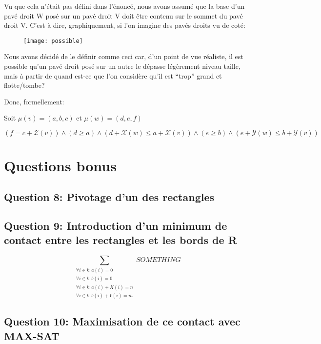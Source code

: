 \documentclass[a4paper,10pt]{article}
\begin{document}
Vu que cela n'était pas défini dans l'énoncé, nous avons assumé que la base d'un pavé droit W posé sur un pavé droit V doit être contenu sur le sommet du pavé droit V. C'est à dire, graphiquement, si l'on imagine des pavés droits vu de coté:

\begin{figure}[htb!]
\centering
\texttt{[image: possible]}
\end{figure}

Nous avons décidé de le définir comme ceci car, d'un point de vue réaliste, il est possible qu'un pavé droit posé sur un autre le dépasse légèrement niveau taille, mais à partir de quand est-ce que l'on considère qu'il est ``trop'' grand et flotte/tombe?

Donc, formellement: 

Soit $\mu(v) = (a,b,c)$ et $\mu(w) = (d,e,f)$

$(f = c + \mathcal{Z}(v)) \land (d \geq a) \land (d+\mathcal{X}(w) \leq a+\mathcal{X}(v)) \land (e \geq b) \land(e+\mathcal{Y}(w) \leq b+\mathcal{Y}(v))$ 

\section{Questions bonus}

\subsection{Question 8: Pivotage d'un des rectangles}

\subsection{Question 9: Introduction d'un minimum de contact entre les rectangles et les bords de R}

$$ \sum_{\substack{\forall i \in k : a(i) = 0\\
                \forall i \in k : b(i) = 0\\
                \forall i \in k : a(i)+ X(i) = n\\
                \forall i \in k : b(i)+ Y(i) = m }}
SOMETHING $$

\subsection{Question 10: Maximisation de ce contact avec MAX-SAT}
\end{document}

